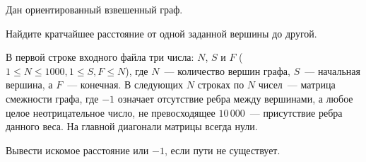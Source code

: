 

Дан ориентированный взвешенный граф.

Найдите кратчайшее расстояние от одной заданной вершины до другой.

\InputFile
В первой строке входного файла три числа: $N$, $S$ и $F$ (${1 \leqslant N \leqslant 1000}, {1 \leqslant S, F \leqslant N}$), где $N$~--- количество вершин графа, $S$~--- начальная вершина, а $F$~--- конечная. 
В следующих $N$ строках по $N$ чисел~--- матрица смежности графа, где
$-1$ означает отсутствие ребра между вершинами, а любое целое неотрицательное число, не превосходящее $10\,000$~--- присутствие ребра данного веса. На
главной диагонали матрицы всегда нули.

\OutputFile
Вывести искомое расстояние или $-1$, если пути не существует.

